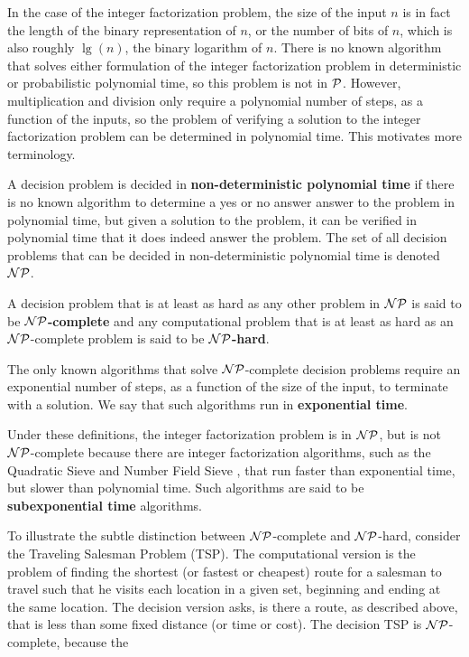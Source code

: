 In the case of the integer factorization problem, the size of the input $n$ is in fact the length of the binary representation of $n$, or the number of bits of $n$, which is also roughly $\lg(n)$, the binary logarithm of $n$. There is no known algorithm that solves either formulation of the integer factorization problem in deterministic or probabilistic polynomial time, so this problem is not in $\P$. However, multiplication and division only require a polynomial number of steps, as a function of the inputs, so the problem of verifying a solution to the integer factorization problem can be determined in polynomial time. This motivates more terminology.

\begin{definition}
	A decision problem is decided in {\bf non-deterministic polynomial time}  if there is no known algorithm to determine a yes or no answer answer to the problem in polynomial time, but given a solution to the problem, it can be verified in polynomial time that it does indeed answer the problem. The set of all decision problems that can be decided in non-deterministic polynomial time is denoted $\NP$. \index{$\NP$}

	A decision problem that is at least as hard as any other problem in $\NP$ is said to be {\bf $\NP$-complete}  and any computational problem that is at least as hard as an $\NP$-complete problem is said to be {\bf $\NP$-hard}. 
\end{definition}

The only known algorithms that solve $\NP$-complete decision problems require an exponential number of steps, as a function of the size of the input, to terminate with a solution. We say that such algorithms run in {\bf exponential time}. 

Under these definitions, the integer factorization problem is in $\NP$, but is not $\NP$-complete because there are integer factorization algorithms, such as the Quadratic Sieve  and Number Field Sieve , that run faster than exponential time, but slower than polynomial time. Such algorithms are said to be {\bf subexponential time}  algorithms.

To illustrate the subtle distinction between $\NP$-complete and $\NP$-hard, consider the Traveling Salesman Problem (TSP). The computational version is the problem of finding the shortest (or fastest or cheapest) route for a salesman to travel such that he visits each location in a given set, beginning and ending at the same location. The decision version asks, is there a route, as described above, that is less than some fixed distance (or time or cost). The decision TSP is $\NP$-complete, because the


